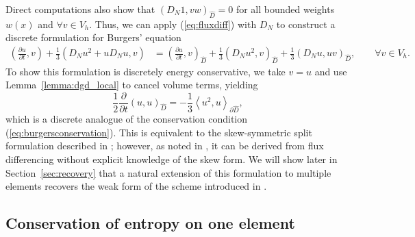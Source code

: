 \documentclass[preprint,10pt]{article}
\theoremstyle{definition}
\theoremstyle{lemma}
\theoremstyle{theorem}
\theoremstyle{assumption}
\newcommand{\pd}[2]{\frac{\partial#1}{\partial#2}}
\newcommand{\LRp}[1]{\left( #1 \right)}
\newcommand{\LRa}[1]{\left\langle #1 \right\rangle}
\begin{document}
Direct computations also show that $\LRp{D_N 1,vw}_{\widehat{D}} = 0$ for all bounded weights $w(x)$ and $\forall v \in V_h$.  Thus, we can apply (\ref{eq:fluxdiff}) with $D_N$ to construct a discrete formulation for Burgers' equation
\begin{align}
\LRp{\pd{u}{t},v} + \frac{1}{3}\LRp{D_N u^2 + uD_Nu,v} &= \LRp{\pd{u}{t},v}_{\widehat{D}} + \frac{1}{3}\LRp{D_N u^2,v}_{\widehat{D}} + \frac{1}{3}\LRp{D_Nu,uv}_{\widehat{D}},
\qquad \forall v\in V_h.
\label{eq:burgersdiscrete}
\end{align}
To show this formulation is discretely energy conservative, we take $v=u$ and use Lemma~\ref{lemma:dgd_local} to cancel volume terms, yielding
\[
\frac{1}{2}\pd{}{t}\LRp{u,u}_{\widehat{D}} = -\frac{1}{3}\LRa{u^2,u}_{\partial \widehat{D}},
\]
which is a discrete analogue of the conservation condition (\ref{eq:burgersconservation}).  This is equivalent to the skew-symmetric split formulation described in \cite{gassner2013skew}; however, as noted in \cite{chen2017entropy}, it can be derived from flux differencing without explicit knowledge of the skew form.  We will show later in Section~\ref{sec:recovery} that a natural extension of this formulation to multiple elements recovers the weak form of the scheme introduced in \cite{ranocha2017extended}.  



\subsection{Conservation of entropy on one element}
\end{document}
